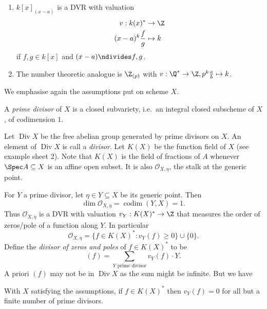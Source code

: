 \documentclass[a4paper]{article}
\newcommand{\sh}[1]{\mathcal{#1}} %
\DeclareMathOperator{\codim}{codim} %
\DeclareMathOperator{\Div}{Div} %
\begin{document}
\begin{eg}\leavevmode
  \begin{enumerate}
  \item \(k[x]_{(x - a)}\) is a DVR with valuation
    \begin{align*}
      v: k(x)^* &\to \Z \\
      (x - a)^k \frac{f}{g} &\mapsto k
    \end{align*}
    if \(f, g \in k[x]\) and \((x - a) \ndivides f, g\).
  \item The number theoretic analogue is \(\Z_{(p)}\) with \(v: \Q^* \to \Z, p^k \frac{a}{b} \mapsto k\).
  \end{enumerate}
\end{eg}

We emphasise again the assumptions put on scheme \(X\).

\begin{definition}
  A \emph{prime divisor} of \(X\) is a closed subvariety, i.e.\ an integral closed subscheme of \(X\), of codimension \(1\).
\end{definition}

Let \(\Div X\) be the free abelian group generated by prime divisors on \(X\). An element of \(\Div X\) is call a \emph{divisor}. Let \(K(X)\) be the function field of \(X\) (see example sheet 2). Note that \(K(X)\) is the field of fractions of \(A\) whenever \(\Spec A \subseteq X\) is an affine open subset. It is also \(\sh O_{X, \eta}\), the stalk at the generic point.

For \(Y\) a prime divisor, let \(\eta \in Y \subseteq X\) be its generic point. Then
\[
  \dim \sh O_{X, \eta} = \codim(Y, X) = 1.
\]
Thus \(\sh O_{X, \eta}\) is a DVR with valuation \(v_Y: K(X)^* \to \Z\) that measures the order of zeros/pole of a function along \(Y\). In particular
\[
  \sh O_{X, \eta} = \{f \in K(X)^*: v_Y(f) \geq 0\} \cup \{0\}.
\]
Define the \emph{divisor of zeros and poles} of \(f \in K(X)^*\) to be
\[
  (f) = \sum_{Y \text{ prime divisor}} v_Y(f) \cdot Y.
\]
A priori \((f)\) may not be in \(\Div X\) as the sum might be infinite. But we have

\begin{lemma}
  With \(X\) satisfying the assumptions, if \(f \in K(X)^*\) then \(v_Y(f) = 0\) for all but a finite number of prime divisors.
\end{lemma}
\end{document}
